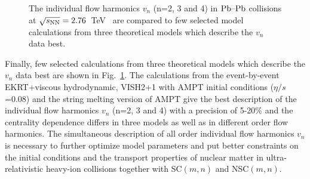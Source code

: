 \begin{figure}[h]
\begin{center}
        \caption{The individual flow harmonics $v_n$ (n=2, 3 and 4) in $\textnormal{Pb--Pb}$ collisions at $\sqrt{s_{\textnormal{NN}}}=2.76$~TeV~\cite{Adam:2016izf} are compared to few selected model calculations from three theoretical models which describe the $v_n$ data best.}
        \label{fig:Figure_11}
              \end{center}
\end{figure}

Finally, few selected calculations from three theoretical models which describe the $v_n$ data best are shown in Fig.~\ref{fig:Figure_11}.
The calculations from the event-by-event EKRT+viscous hydrodynamic, VISH2+1 with AMPT initial conditions ($\eta/s$ =0.08) and the string melting version of AMPT give the best description of the individual flow harmonics $v_n$ (n=2, 3 and 4) with a precision of 5-20\% and the centrality dependence differs in three models as well as in different order flow harmonics.
The simultaneous description of all order individual flow harmonics $v_n$ is necessary to further optimize model parameters and put better constraints on the initial conditions and the transport properties of nuclear matter in ultra-relativistic heavy-ion collisions together with SC$(m,n)$ and NSC$(m,n)$.
